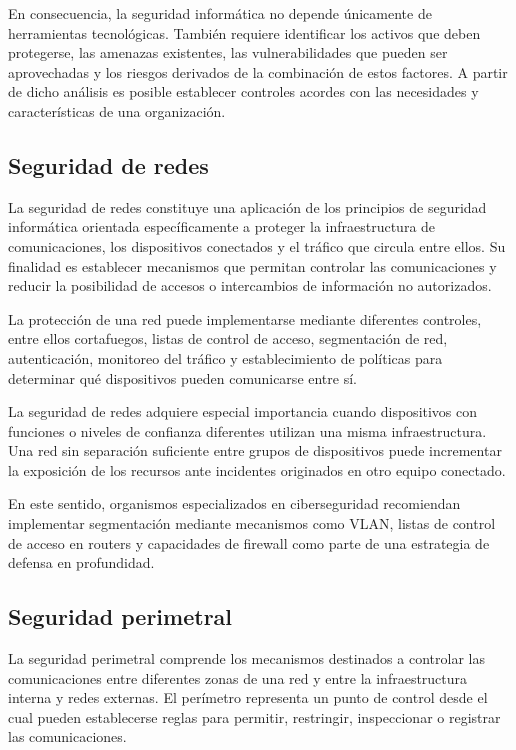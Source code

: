 En consecuencia, la seguridad informática no depende únicamente de herramientas tecnológicas. También requiere identificar los activos que deben protegerse, las amenazas existentes, las vulnerabilidades que pueden ser aprovechadas y los riesgos derivados de la combinación de estos factores. A partir de dicho análisis es posible establecer controles acordes con las necesidades y características de una organización.

\subsection{Seguridad de redes}

La seguridad de redes constituye una aplicación de los principios de seguridad informática orientada específicamente a proteger la infraestructura de comunicaciones, los dispositivos conectados y el tráfico que circula entre ellos. Su finalidad es establecer mecanismos que permitan controlar las comunicaciones y reducir la posibilidad de accesos o intercambios de información no autorizados.

La protección de una red puede implementarse mediante diferentes controles, entre ellos cortafuegos, listas de control de acceso, segmentación de red, autenticación, monitoreo del tráfico y establecimiento de políticas para determinar qué dispositivos pueden comunicarse entre sí.

La seguridad de redes adquiere especial importancia cuando dispositivos con funciones o niveles de confianza diferentes utilizan una misma infraestructura. Una red sin separación suficiente entre grupos de dispositivos puede incrementar la exposición de los recursos ante incidentes originados en otro equipo conectado.

En este sentido, organismos especializados en ciberseguridad recomiendan implementar segmentación mediante mecanismos como VLAN, listas de control de acceso en routers y capacidades de firewall como parte de una estrategia de defensa en profundidad.

\subsection{Seguridad perimetral}

La seguridad perimetral comprende los mecanismos destinados a controlar las comunicaciones entre diferentes zonas de una red y entre la infraestructura interna y redes externas. El perímetro representa un punto de control desde el cual pueden establecerse reglas para permitir, restringir, inspeccionar o registrar las comunicaciones.

